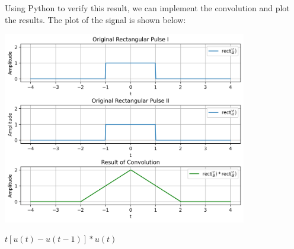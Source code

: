 \documentclass[a4paper, 10pt]{article}
\begin{document}
\begin{solution}
Using Python to verify this result, we can implement the convolution and plot the results.
The plot of the signal is shown below:
\begin{center}
    \includegraphics[width=0.8\textwidth]{images/problem_1_2.png}
\end{center}
\end{solution}

\newpage

\begin{subproblems}[resume]
    \item \( t[u(t)-u(t-1)]*u(t) \)
\end{subproblems}
\end{document}
